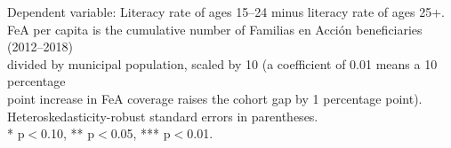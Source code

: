 \begin{table}[htbp]
   \par \raggedright 
   Dependent variable: Literacy rate of ages 15--24 minus literacy rate of ages 25+.\\
   FeA per capita is the cumulative number of Familias en Acci\'{o}n beneficiaries (2012--2018)\\
   divided by municipal population, scaled by 10 (a coefficient of 0.01 means a 10 percentage\\
   point increase in FeA coverage raises the cohort gap by 1 percentage point).\\
   Heteroskedasticity-robust standard errors in parentheses.\\
   * p$<$0.10, ** p$<$0.05, *** p$<$0.01.
\end{table}


